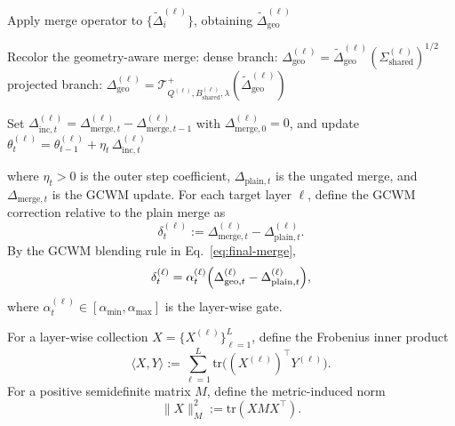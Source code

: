 \documentclass{article}
\begin{document}
\begin{algorithm}[H]
{{Apply merge operator to \(\{\tilde{\Delta}_i^{(\ell)}\}\), obtaining \(\tilde{\Delta}_{\mathrm{geo}}^{(\ell)}\)\;

Recolor the geometry-aware merge:\;
\Indp
dense branch: \(\Delta_{\mathrm{geo}}^{(\ell)}=\tilde{\Delta}_{\mathrm{geo}}^{(\ell)}(\Sigma_{\mathrm{shared}}^{(\ell)})^{1/2}\)\;
projected branch: \(\Delta_{\mathrm{geo}}^{(\ell)}=\mathcal{T}_{Q^{(\ell)},B_{\mathrm{shared}}^{(\ell)},\lambda}^{+}(\tilde{\Delta}_{\mathrm{geo}}^{(\ell)})\)\;
\Indm

}
\Indm
}

Set \(\Delta_{\mathrm{inc},t}^{(\ell)}=\Delta_{\mathrm{merge},t}^{(\ell)}-\Delta_{\mathrm{merge},t-1}^{(\ell)}\) with \(\Delta_{\mathrm{merge},0}^{(\ell)}=0\), and update \(\theta_t^{(\ell)}=\theta_{t-1}^{(\ell)}+\eta_t\,\Delta_{\mathrm{inc},t}^{(\ell)}\)\;

\;
\end{algorithm}





where \(\eta_t>0\) is the outer step coefficient, \(\Delta_{\mathrm{plain},t}\) is the ungated merge, and \(\Delta_{\mathrm{merge},t}\) is the GCWM update. For each target layer \(\ell\), define the GCWM correction relative to the plain merge as
\begin{equation}
\delta_t^{(\ell)}
:=
\Delta_{\mathrm{merge},t}^{(\ell)}-\Delta_{\mathrm{plain},t}^{(\ell)}.
\label{eq:delta_def_appendix_final}
\end{equation}
By the GCWM blending rule in Eq.~\eqref{eq:final-merge},
\begin{equation}
\delta_t^{(\ell)}
=
\alpha_t^{(\ell)}
\Bigl(
\Delta_{\mathrm{geo},t}^{(\ell)}-\Delta_{\mathrm{plain},t}^{(\ell)}
\Bigr),
\label{eq:delta_gate_identity_appendix_final}
\end{equation}
where \(\alpha_t^{(\ell)}\in[\alpha_{\min},\alpha_{\max}]\) is the layer-wise gate.

For a layer-wise collection \(X=\{X^{(\ell)}\}_{\ell=1}^L\), define the Frobenius inner product
\[
\langle X,Y\rangle
:=
\sum_{\ell=1}^L \mathrm{tr}\!\big((X^{(\ell)})^\top Y^{(\ell)}\big).
\]
For a positive semidefinite matrix \(M\), define the metric-induced norm
\begin{equation}
\|X\|_{M}^2
:=
\mathrm{tr}(X M X^\top).
\label{eq:metric_norm_appendix_final}
\end{equation}
\end{document}
